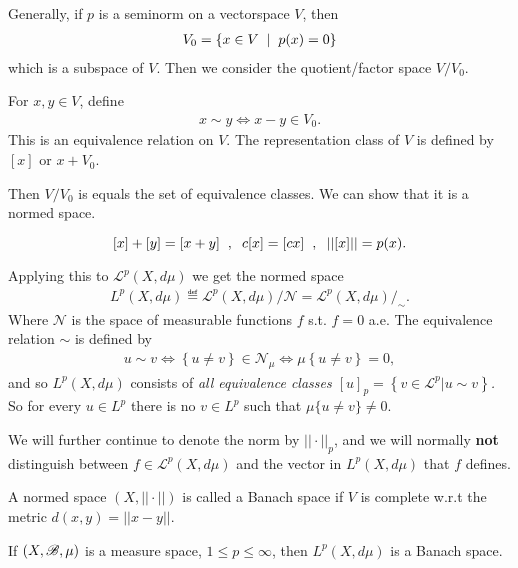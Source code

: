 Generally, if $p$ is a seminorm on a vectorspace $V$, then
 \begin{align}
    V_0 = \left\{x\in V\hspace{2mm}|\hspace{2mm} p(x)=0 \right\}
\end{align}
which is a subspace of $V$. Then we consider the quotient/factor space $V/V_0.$

\begin{definition}
    For $x,y\in V$, define \begin{align}
        x\sim y \iff x-y\in V_0.
    \end{align}
    This is an equivalence relation on $V$. The representation class of $V$ is defined by $[x]$ or $x+V_0$.
\end{definition}

Then $V/V_0$ is equals the set of equivalence classes. We can show that it is a normed space. 

$$[x]+[y]=[x+y]\hspace{2mm},\hspace{2mm} c[x]=[cx]\hspace{2mm},\hspace{2mm} ||[x]||=p(x). $$

Applying this to $\mathcal L^p(X,d\mu)$ we get the normed space \begin{align}
    L^p(X,d\mu) \eqdef \mathcal L ^p(X,d\mu)/\mathcal N = \mathcal{L}^p(X,d\mu)/_{\sim}.
\end{align}
Where $\mathcal N$ is the space of measurable functions $f$ s.t. $f=0$ a.e. The equivalence relation \(\sim\) is defined by 
\begin{align*}
    u\sim v \Longleftrightarrow \left\{u\neq v\right\} \in \mathcal{N}_{\mu} \Longleftrightarrow \mu\left\{u\neq v\right\} = 0,
\end{align*}
and so \(L^p(X,d\mu)\) consists of \emph{all equivalence classes \([u]_p = \left\{v\in\mathcal{L}^p| u\sim v\right\}\).} So for every
\(u\in L^p\) there is no \(v\in L^p\) such that \(\mu\{u\neq v\} \neq 0\).

We will further continue to denote the norm by 
$||\cdot||_p$, and we will normally \textbf{not} distinguish between $f\in \mathcal L^p(X,d\mu)$ and the vector in 
$L^p(X,d\mu)$ that $f$ defines.

\begin{definition}
    A normed space $(X,||\cdot||)$ is called a Banach space if $V$ is complete w.r.t the metric $d(x,y)=||x-y||$.
\end{definition}

\begin{theorem}
    If $(X,\mathscr{B},\mu)$ is a measure space, $1\leq p\leq \infty$, then $L^p(X,d\mu)$ is a Banach space.
\end{theorem}

